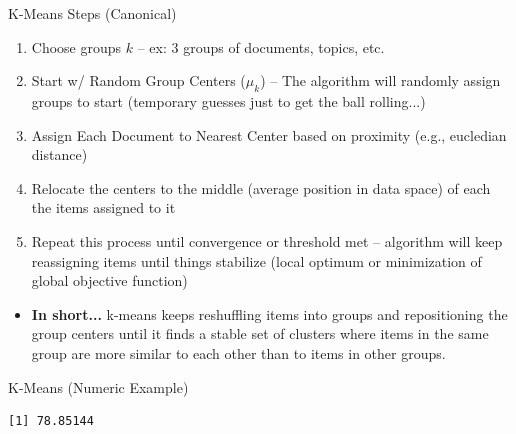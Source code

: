 \documentclass[
  ignorenonframetext,
  aspectratio=169]{beamer}
\newenvironment{Shaded}{\begin{snugshade}}{\end{snugshade}}
\newcommand{\AttributeTok}[1]{\textcolor[rgb]{0.13,0.29,0.53}{#1}}
\newcommand{\CommentTok}[1]{\textcolor[rgb]{0.56,0.35,0.01}{\textit{#1}}}
\newcommand{\DecValTok}[1]{\textcolor[rgb]{0.00,0.00,0.81}{#1}}
\newcommand{\FunctionTok}[1]{\textcolor[rgb]{0.13,0.29,0.53}{\textbf{#1}}}
\newcommand{\NormalTok}[1]{#1}
\newcommand{\OtherTok}[1]{\textcolor[rgb]{0.56,0.35,0.01}{#1}}
\newcommand{\SpecialCharTok}[1]{\textcolor[rgb]{0.81,0.36,0.00}{\textbf{#1}}}
\begin{document}
\begin{frame}{K-Means Steps (Canonical)}
\label{k-means-steps-canonical}
\begin{enumerate}
\item Choose groups $k$ -- ex: 3 groups of documents, topics, etc. \pause
\item Start w/ Random Group Centers ($\mu_k$) -- The algorithm will randomly assign groups to start \pause (temporary guesses just to get the ball rolling...)
\item Assign Each Document to Nearest Center based on proximity (e.g., eucledian distance) \pause
\item Relocate the centers to the middle (average position in data space) of each the items assigned to it \pause
\item Repeat this process until convergence or threshold met -- algorithm will keep reassigning items until things stabilize (local optimum or minimization of global objective function) \pause
\end{enumerate}
\begin{itemize}
\item[] \textbf{In short...} k-means keeps reshuffling items into groups and repositioning the group centers until it finds a stable set of clusters where items in the same group are more similar to each other than to items in other groups.
\end{itemize}
\end{frame}

\begin{frame}[fragile]{K-Means (Numeric Example)}
\label{k-means-numeric-example}
\scriptsize

\begin{Shaded}
\end{Shaded}

\begin{verbatim}
[1] 78.85144
\end{verbatim}
\end{frame}
\end{document}
